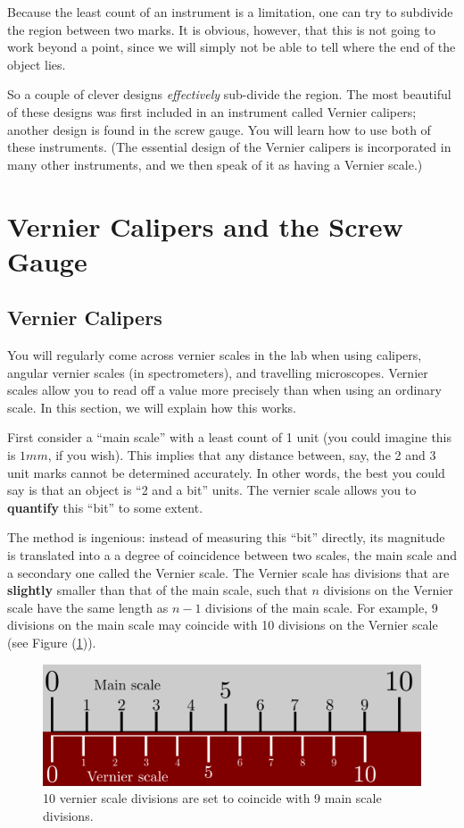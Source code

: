 Because the least count of an instrument is a limitation, one can try to subdivide the region between two marks. It is obvious, however, that this is not going to work beyond a point, since we will simply not be able to tell where the end of the object lies. 

So a couple of clever designs \textit{effectively} sub-divide the region. The most beautiful of these designs was first included in an instrument called Vernier calipers; another design is found in the screw gauge. You will learn how to use both of these instruments. (The essential design of the Vernier calipers is incorporated in many other instruments, and we then speak of it as having a Vernier scale.)

\section{Vernier Calipers and the Screw Gauge}

\subsection{Vernier Calipers}

You will regularly come across vernier scales in the lab when using calipers, angular vernier scales (in spectrometers), and travelling microscopes. Vernier scales allow you to read off a value more precisely than when using an ordinary scale. In this section, we will explain how this works.

First consider a ``main scale'' with a least count of 1 unit (you could imagine this is $1mm$, if you wish). This implies that any distance between, say, the 2 and 3 unit marks cannot be determined accurately. In other words, the best you could say is that an object is ``2 and a bit'' units. The vernier scale allows you to \textbf{quantify} this ``bit'' to some extent.  

The method is ingenious: instead of measuring this ``bit'' directly, its magnitude is translated into a a degree of coincidence between two scales, the main scale and a secondary one called the Vernier scale. The Vernier scale has divisions that are \textbf{slightly} smaller than that of the main scale, such that $n$ divisions on the Vernier scale have the same length as $n-1$ divisions of the main scale. For example,  9 divisions on the main scale may coincide with 10 divisions on the Vernier scale (see Figure (\ref{fig:vernier_1})). 

\begin{figure}[!htb]
    \centering
    \includegraphics[scale=0.75]{figs/vernier1.png}
    \caption{10 vernier scale divisions are set to coincide with 9 main scale divisions.}
    \label{fig:vernier_1}
\end{figure}

